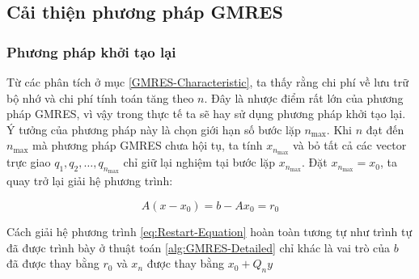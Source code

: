 \documentclass[14pt, a4paper]{article}
\numberwithin{equation}{section}
\numberwithin{algorithm}{section}
\numberwithin{figure}{section}
\numberwithin{dl}{section}
\numberwithin{md}{section}
\numberwithin{bd}{section}
\numberwithin{dn}{section}
\numberwithin{hq}{section}
\begin{document}
\subsection{Cải thiện phương pháp GMRES}

\subsubsection{Phương pháp khởi tạo lại}

Từ các phân tích ở mục \ref{GMRES-Characteristic}, ta thấy rằng chi phí về lưu trữ bộ nhớ và chi phí tính toán tăng theo $n$. Đây là nhược điểm rất lớn của phương pháp GMRES, vì vậy trong thực tế ta sẽ hay sử dụng phương pháp khởi tạo lại.
Ý tưởng của phương pháp này là chọn giới hạn số bước lặp $n_{\max}$. Khi $n$ đạt đến $n_{\max}$ mà phương pháp GMRES chưa hội tụ, ta tính $x_{n_{\max}}$ và bỏ tất cả các vector trực giao $q_1, q_2, \dots, q_{n_{\max}}$ chỉ giữ lại nghiệm tại bước lặp $x_{n_{\max}}$. Đặt $x_{n_{\max}}=x_0$, ta quay trở lại giải hệ phương trình:

\begin{equation} \label{eq:Restart-Equation}
    A(x - x_0) = b - A x_0 = r_0
\end{equation}

Cách giải hệ phương trình \ref{eq:Restart-Equation} hoàn toàn tương tự như trình tự đã được trình bày ở thuật toán \ref{alg:GMRES-Detailed} chỉ khác là vai trò của $b$ đã được thay bằng $r_0$ và $x_n$ được thay bằng $x_0+Q_n y$
\end{document}
